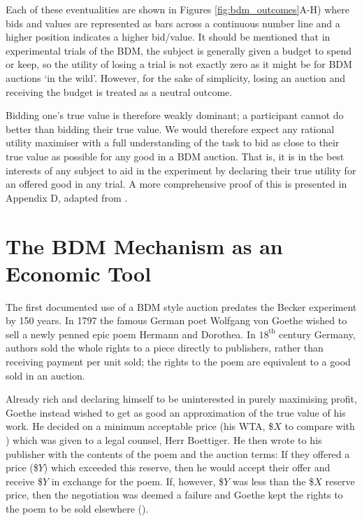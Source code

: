 Each of these eventualities are shown in Figures \ref{fig:bdm_outcomes}A-H) where bids and values are represented as bars across a continuous number line and a higher position indicates a higher bid/value. It should be mentioned that in experimental trials of the BDM, the subject is generally given a budget to spend or keep, so the utility of losing a trial is not exactly zero as it might be for BDM auctions ‘in the wild’. However, for the sake of simplicity, losing an auction and receiving the budget is treated as a neutral outcome.

Bidding one’s true value is therefore weakly dominant; a participant cannot do better than bidding their true value. We would therefore expect any rational utility maximiser with a full understanding of the task to bid as close to their true value as possible for any good in a BDM auction. That is, it is in the best interests of any subject to aid in the experiment by declaring their true utility for an offered good in any trial. A more comprehensive proof of this is presented in Appendix D, adapted from \cite{milgromTheoryAuctionsCompetitive1982}.

\clearpage
\section{The BDM Mechanism as an Economic Tool}

The first documented use of a BDM style auction predates the Becker experiment by 150 years. In 1797 the famous German poet Wolfgang von Goethe wished to sell a newly penned epic poem Hermann and Dorothea. In $18^{\text{th}}$ century Germany, authors sold the whole rights to a piece directly to publishers, rather than receiving payment per unit sold; the rights to the poem are equivalent to a good sold in an auction.

Already rich and declaring himself to be uninterested in purely maximising profit, Goethe instead wished to get as good an approximation of the true value of his work. He decided on a minimum acceptable price (his WTA, \$$X$ to compare with \cite{beckerMeasuringUtilitySingleresponse1964}) which was given to a legal counsel, Herr Boettiger. He then wrote to his publisher with the contents of the poem and the auction terms: If they offered a price (\$$Y$) which exceeded this reserve, then he would accept their offer and receive \$$Y$ in exchange for the poem. If, however, \$$Y$ was less than the \$$X$ reserve price, then the negotiation was deemed a failure and Goethe kept the rights to the poem to be sold elsewhere (\cite{moldovanuGoethesSecondPriceAuction1998}).

